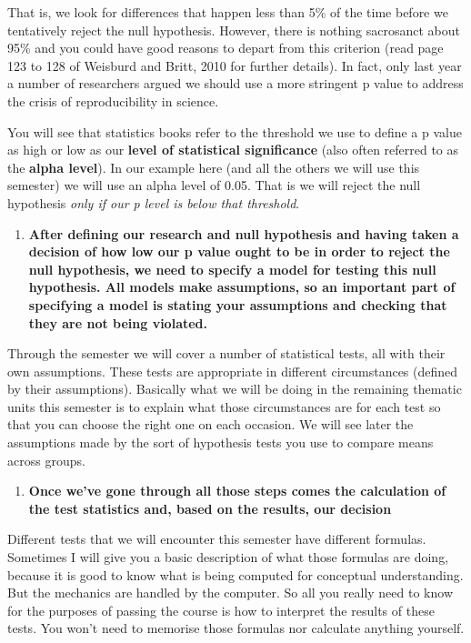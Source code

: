 \documentclass[]{book}
\providecommand{\tightlist}{%
  \setlength{\itemsep}{0pt}\setlength{\parskip}{0pt}}
\theoremstyle{definition}
\theoremstyle{definition}
\theoremstyle{definition}
\theoremstyle{remark}
\begin{document}
That is, we look for differences that happen less than 5\% of the time
before we tentatively reject the null hypothesis. However, there is
nothing sacrosanct about 95\% and you could have good reasons to depart
from this criterion (read page 123 to 128 of Weisburd and Britt, 2010
for further details). In fact, only last year a number of researchers
argued we should use a more stringent p value to address the crisis of
reproducibility in science.

You will see that statistics books refer to the threshold we use to
define a p value as high or low as our \textbf{level of statistical
significance} (also often referred to as the \textbf{alpha level}). In
our example here (and all the others we will use this semester) we will
use an alpha level of 0.05. That is we will reject the null hypothesis
\emph{only if our p level is below that threshold}.

\begin{enumerate}
\def\labelenumi{\arabic{enumi}.}
\setcounter{enumi}{4}
\tightlist
\item
  \textbf{After defining our research and null hypothesis and having
  taken a decision of how low our p value ought to be in order to reject
  the null hypothesis, we need to specify a model for testing this null
  hypothesis. All models make assumptions, so an important part of
  specifying a model is stating your assumptions and checking that they
  are not being violated. }
\end{enumerate}

Through the semester we will cover a number of statistical tests, all
with their own assumptions. These tests are appropriate in different
circumstances (defined by their assumptions). Basically what we will be
doing in the remaining thematic units this semester is to explain what
those circumstances are for each test so that you can choose the right
one on each occasion. We will see later the assumptions made by the sort
of hypothesis tests you use to compare means across groups.

\begin{enumerate}
\def\labelenumi{\arabic{enumi}.}
\setcounter{enumi}{5}
\tightlist
\item
  \textbf{Once we've gone through all those steps comes the calculation
  of the test statistics and, based on the results, our decision}
\end{enumerate}

Different tests that we will encounter this semester have different
formulas. Sometimes I will give you a basic description of what those
formulas are doing, because it is good to know what is being computed
for conceptual understanding. But the mechanics are handled by the
computer. So all you really need to know for the purposes of passing the
course is how to interpret the results of these tests. You won't need to
memorise those formulas nor calculate anything yourself.
\end{document}
